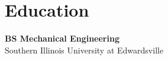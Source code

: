 \documentclass[a4paper,10pt]{article}
\begin{document}
\begin{adjustbox}{valign=t}
\begin{minipage}{0.3\textwidth}
\vfill

\section*{Education}
	\begin{description}
	\raggedright
	\item [\normalfont \textcolor{ColorOne}{2007}] \textbf{BS Mechanical Engineering} \\
	Southern Illinois University at Edwardsville
\end{description}

\vfill
\end{minipage}
\end{adjustbox}
%
%
%
\hfill
\begin{adjustbox}{valign=t}
\begin{minipage}{0.05\textwidth} %
\MyVerticalRule  %
\end{minipage}
\end{adjustbox}
\hfill
%
\end{document}
